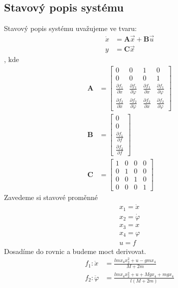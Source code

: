 \documentclass[a4paper, 12pt]{article}
\begin{document}
		\subsection{Stavový popis systému}
			Stavový popis systému uvažujeme ve tvaru:
			\begin{align*}
				\dot{x} &= \mathbf{A}\vec{x}+\mathbf{B}\vec{u}\\
				y &= \mathbf{C}\vec{x}   %
			\end{align*}
			, kde 
			\begin{align*}
				\mathbf{A} &= \left[\begin{matrix}
					0 & 0 & 1 & 0\\
					0 & 0 & 0 & 1\\
					\frac{\partial f_1}{\partial \dot{x}} & \frac{\partial f_1}{\partial \dot{\varphi}} & \frac{\partial f_1}{\partial x} & \frac{\partial f_1}{\partial\varphi}\\
					\frac{\partial f_2}{\partial \dot{x}} & \frac{\partial f_2}{\partial \dot{\varphi}} & \frac{\partial f_2}{\partial x} & \frac{\partial f_2}{\partial \varphi}	
				\end{matrix}\right]\\
				\mathbf{B} &= \left[\begin{matrix}
					0\\
					0\\
					\frac{\partial f_1}{\partial f}\\
					\frac{\partial f_2}{\partial f}
				\end{matrix}\right]\\
				\mathbf{C} &= \left[\begin{matrix}
					1 & 0 & 0 & 0\\
					0 & 1 & 0 & 0\\
					0 & 0 & 1 & 0\\
					0 & 0 & 0 & 1
				\end{matrix}\right]
			\end{align*}
			Zavedeme si stavové proměnné
			\begin{align*}
				x_1 = \dot{x}\\
				x_2 = \dot{\varphi}\\
				x_3 = x\\
				x_4 = \varphi\\
				u = f
			\end{align*}
			Dosadíme do rovnic a budeme moct derivovat.
			\begin{align*}
				f_1: \ddot{x}&=\frac{l m x_4 x_2^2 + u - g m x_4}{M + 2m}\\
				f_2: \ddot{\varphi}&=\frac{l m x_4 x_2^2 + u + M g x_4 + m g x_4}{l\left(M+2m\right)}
			\end{align*}
\end{document}
